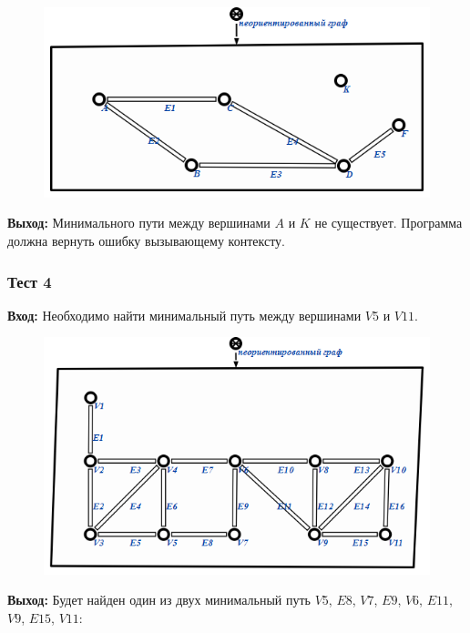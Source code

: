 \begin{figure}[h!]
  \centering
  \includegraphics[scale=0.8]{images/2/test/3_In}
  \label{fig:Test3_In}
\end{figure}


\textbf{Выход:}
Минимального пути между вершинами $A$ и $K$ не существует. Программа должна вернуть ошибку вызывающему контексту.

\newpage

\subsubsection{Тест 4}
\textbf{Вход:}
Необходимо найти минимальный путь между вершинами $V5$ и $V11$. 

\begin{figure}[h!]
  \centering
  \includegraphics[scale=0.6]{images/2/test/4_In}
  \label{fig:Test4_In}
\end{figure}


\textbf{Выход:}
Будет найден один из двух минимальный путь $V5$, $E8$, $V7$, $E9$, $V6$, $E11$, $V9$, $E15$, $V11$:

